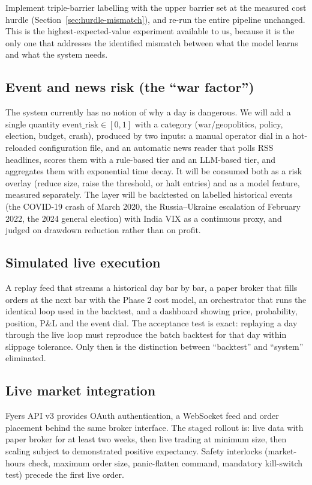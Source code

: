 \documentclass[11pt,a4paper]{article}
\begin{document}
Implement triple-barrier labelling with the upper barrier set at the measured cost hurdle
(Section~\ref{sec:hurdle-mismatch}), and re-run the entire pipeline unchanged. This is
the highest-expected-value experiment available to us, because it is the only one that
addresses the identified mismatch between what the model learns and what the system needs.

\subsection{Event and news risk (the ``war factor'')}

The system currently has no notion of why a day is dangerous. We will add a single
quantity $\text{event\_risk}\in[0,1]$ with a category (war/geopolitics, policy, election,
budget, crash), produced by two inputs: a manual operator dial in a hot-reloaded
configuration file, and an automatic news reader that polls RSS headlines, scores them
with a rule-based tier and an LLM-based tier, and aggregates them with exponential time
decay. It will be consumed both as a risk overlay (reduce size, raise the threshold, or
halt entries) and as a model feature, measured separately. The layer will be backtested
on labelled historical events (the COVID-19 crash of March 2020, the Russia--Ukraine
escalation of February 2022, the 2024 general election) with India VIX as a continuous
proxy, and judged on drawdown reduction rather than on profit.

\subsection{Simulated live execution}

A replay feed that streams a historical day bar by bar, a paper broker that fills orders
at the next bar with the Phase 2 cost model, an orchestrator that runs the identical loop
used in the backtest, and a dashboard showing price, probability, position, P\&L and the
event dial. The acceptance test is exact: replaying a day through the live loop must
reproduce the batch backtest for that day within slippage tolerance. Only then is the
distinction between ``backtest'' and ``system'' eliminated.

\subsection{Live market integration}

Fyers API v3 \cite{fyers,fyerswebsocket} provides OAuth authentication, a WebSocket feed
and order placement behind the same broker interface. The staged rollout is: live data
with paper broker for at least two weeks, then live trading at minimum size, then scaling
subject to demonstrated positive expectancy. Safety interlocks (market-hours check,
maximum order size, panic-flatten command, mandatory kill-switch test) precede the first
live order.
\end{document}
